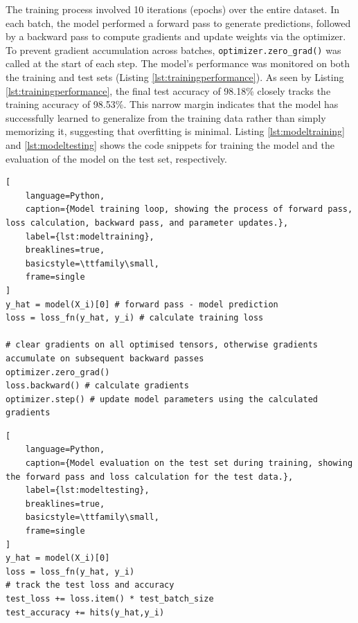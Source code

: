 \documentclass[11pt]{article}
\begin{document}
The training process involved 10 iterations (epochs) over the entire dataset. In each batch, the model performed a forward pass 
to generate predictions, followed by a backward pass to compute gradients and update weights via the optimizer. To prevent gradient accumulation across batches, 
\texttt{optimizer.zero\_grad()} was called at the start of each step. The model's performance was monitored on both the training and test sets (Listing \ref{lst:trainingperformance}). 
As seen by Listing \ref{lst:trainingperformance}, the final test accuracy of 98.18\% closely tracks the training accuracy of 98.53\%. This narrow margin indicates that the model has successfully learned to generalize from the training data rather than simply memorizing it, suggesting that overfitting is minimal.
Listing \ref{lst:modeltraining} and \ref{lst:modeltesting} shows the code snippets for training the model and the evaluation of the model on the test set, respectively.

\begin{lstlisting}[
    language=Python, 
    caption={Model training loop, showing the process of forward pass, loss calculation, backward pass, and parameter updates.},
    label={lst:modeltraining},
    breaklines=true,
    basicstyle=\ttfamily\small,
    frame=single
]
y_hat = model(X_i)[0] # forward pass - model prediction
loss = loss_fn(y_hat, y_i) # calculate training loss

# clear gradients on all optimised tensors, otherwise gradients accumulate on subsequent backward passes
optimizer.zero_grad() 
loss.backward() # calculate gradients
optimizer.step() # update model parameters using the calculated gradients
\end{lstlisting}   

\begin{lstlisting}[
    language=Python, 
    caption={Model evaluation on the test set during training, showing the forward pass and loss calculation for the test data.},
    label={lst:modeltesting},
    breaklines=true,
    basicstyle=\ttfamily\small,
    frame=single
]
y_hat = model(X_i)[0]
loss = loss_fn(y_hat, y_i)
# track the test loss and accuracy
test_loss += loss.item() * test_batch_size
test_accuracy += hits(y_hat,y_i)
\end{lstlisting}  
\end{document}
